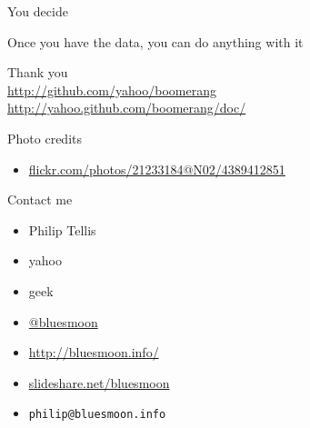 \documentclass{beamer}
\begin{document}
\begin{frame}{You decide}
  \begin{center}
  Once you have the data, you can do anything with it
  \end{center}
\end{frame}

\begin{frame}{}
  \begin{center}
  Thank you \\
  \tiny{
  \href{http://www.github.com/yahoo/boomerang/}{http://github.com/yahoo/boomerang} \\
  \href{http://yahoo.github.com/boomerang/doc/}{http://yahoo.github.com/boomerang/doc/}
  }
  \end{center}
\end{frame}

\begin{frame}{Photo credits}
  \begin{itemize}
  \item \href{http://www.flickr.com/photos/21233184@N02/4389412851/}{flickr.com/photos/21233184@N02/4389412851}
  \end{itemize}
\end{frame}

\begin{frame}{Contact me}
  \begin{itemize}
  \item Philip Tellis
  \item yahoo
  \item geek
  \item \href{http://twitter.com/bluesmoon}{@bluesmoon}
  \item \href{http://bluesmoon.info/}{http://bluesmoon.info/}
  \item \href{http://www.slideshare.net/bluesmoon}{slideshare.net/bluesmoon}
  \item \small{\texttt{philip@bluesmoon.info}}
  \end{itemize}
\end{frame}
\end{document}
